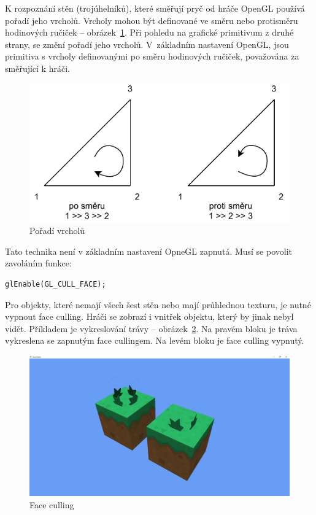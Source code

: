 \documentclass[thesis=M,czech]{FITthesis}[2019/12/23]
\begin{document}
K rozpoznání stěn (trojúhelníků), které směřují pryč od hráče OpenGL používá pořadí jeho vrcholů. Vrcholy mohou být definované ve směru nebo protisměru hodinových ručiček  -- obrázek~\ref{fig:winding_order}. Při pohledu na grafické primitivum z druhé strany, se změní pořadí jeho vrcholů. V~základním nastavení OpenGL, jsou primitiva s vrcholy definovanými po směru hodinových ručiček, považována za směřující k hráči.

\begin{figure}\centering
	\includegraphics[width=\textwidth]{images/winding_order}
	\caption[Pořadí vrcholů]{Pořadí vrcholů}\label{fig:winding_order}
\end{figure}

Tato technika není v základním nastavení OpneGL zapnutá. Musí se povolit zavoláním funkce:

\begin{verbatim}
glEnable(GL_CULL_FACE);
\end{verbatim}

Pro objekty, které nemají všech šest stěn nebo mají průhlednou texturu, je nutné vypnout face culling. Hráči se zobrazí i vnitřek objektu, který by jinak nebyl vidět. Příkladem je vykreslování trávy -- obrázek~\ref{fig:face_culling}. Na pravém bloku je tráva vykreslena se zapnutým face cullingem. Na levém bloku je face culling vypnutý.

\begin{figure}\centering
	\includegraphics[width=\textwidth]{images/face_culling}
	\caption[Face culling]{Face culling}\label{fig:face_culling}
\end{figure}
\end{document}
